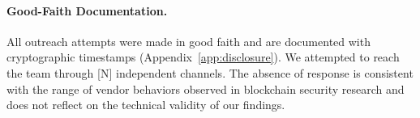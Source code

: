 \paragraph{Good-Faith Documentation.}
All outreach attempts were made in good faith and are documented with
cryptographic timestamps (Appendix~\ref{app:disclosure}). We attempted to
reach the team through [N] independent channels. The absence of response
is consistent with the range of vendor behaviors observed in blockchain
security research and does not reflect on the technical validity of our
findings.
